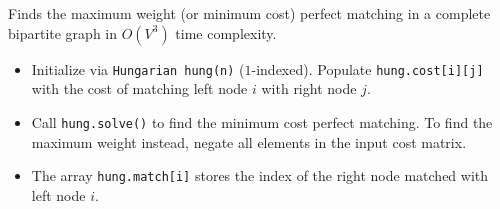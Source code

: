 
Finds the maximum weight (or minimum cost) perfect matching in a complete bipartite graph in $O(V^3)$ time complexity. 



\begin{itemize}
    \item Initialize via \lstinline|Hungarian hung(n)| ($1$-indexed). Populate \lstinline|hung.cost[i][j]| with the cost of matching left node $i$ with right node $j$.
    \item Call \lstinline|hung.solve()| to find the minimum cost perfect matching. To find the maximum weight instead, negate all elements in the input cost matrix.
    \item The array \lstinline|hung.match[i]| stores the index of the right node matched with left node $i$.
\end{itemize}

